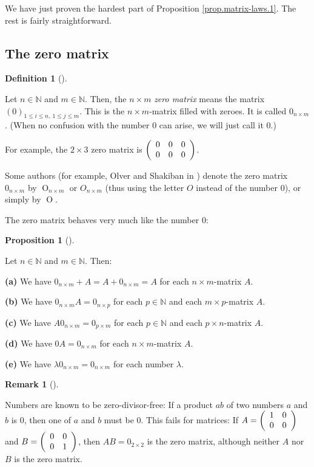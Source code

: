 \documentclass[numbers=enddot,12pt,final,onecolumn,notitlepage]{scrartcl}%
\theoremstyle{definition}
\newtheorem{prop}[theo]{Proposition}
\newenvironment{proposition}[1][]
{\begin{prop}[#1]\begin{leftbar}}
{\end{leftbar}\end{prop}}
\newtheorem{defi}[theo]{Definition}
\newenvironment{definition}[1][]
{\begin{defi}[#1]\begin{leftbar}}
{\end{leftbar}\end{defi}}
\newtheorem{remk}[theo]{Remark}
\newenvironment{remark}[1][]
{\begin{remk}[#1]\begin{leftbar}}
{\end{leftbar}\end{remk}}
\begin{document}
We have just proven the hardest part of Proposition \ref{prop.matrix-laws.1}.
The rest is fairly straightforward.

\subsection{The zero matrix}

\begin{definition}
Let $n\in\mathbb{N}$ and $m\in\mathbb{N}$. Then, the $n\times m$\textit{ zero
matrix} means the matrix $\left(  0\right)  _{1\leq i\leq n,\ 1\leq j\leq m}$.
This is the $n\times m$-matrix filled with zeroes. It is called $0_{n\times
m}$. (When no confusion with the number $0$ can arise, we will just call it
$0$.)
\end{definition}

For example, the $2\times3$ zero matrix is $\left(
\begin{array}
[c]{ccc}%
0 & 0 & 0\\
0 & 0 & 0
\end{array}
\right)  $.

Some authors (for example, Olver and Shakiban in \cite{OlvSha06}) denote the
zero matrix $0_{n\times m}$ by $\operatorname*{O}\nolimits_{n\times m}$ or
$O_{n\times m}$ (thus using the letter $O$ instead of the number $0$), or
simply by $\operatorname*{O}$.

The zero matrix behaves very much like the number $0$:

\begin{proposition}
\label{prop.matrix-laws.0}Let $n\in\mathbb{N}$ and $m\in\mathbb{N}$. Then:

\textbf{(a)} We have $0_{n\times m}+A=A+0_{n\times m}=A$ for each $n\times
m$-matrix $A$.

\textbf{(b)} We have $0_{n\times m}A=0_{n\times p}$ for each $p\in\mathbb{N}$
and each $m\times p$-matrix $A$.

\textbf{(c)} We have $A0_{n\times m}=0_{p\times m}$ for each $p\in\mathbb{N}$
and each $p\times n$-matrix $A$.

\textbf{(d)} We have $0A=0_{n\times m}$ for each $n\times m$-matrix $A$.

\textbf{(e)} We have $\lambda0_{n\times m}=0_{n\times m}$ for each number
$\lambda$.
\end{proposition}

\begin{remark}
Numbers are known to be zero-divisor-free: If a product $ab$ of two numbers
$a$ and $b$ is $0$, then one of $a$ and $b$ must be $0$. This fails for
matrices: If $A=\left(
\begin{array}
[c]{cc}%
1 & 0\\
0 & 0
\end{array}
\right)  $ and $B=\left(
\begin{array}
[c]{cc}%
0 & 0\\
0 & 1
\end{array}
\right)  $, then $AB=0_{2\times2}$ is the zero matrix, although neither $A$
nor $B$ is the zero matrix.
\end{remark}
\end{document}
